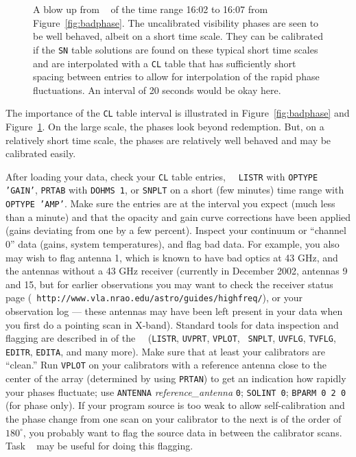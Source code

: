 \begin{figure}
\centering
\caption[{\tt VPLOT} of ``okay'' phases]{A blow up from {\tt
{}} of the time range 16:02 to 16:07 from
Figure~\ref{fig:badphase}.  The uncalibrated visibility phases are
seen to be well behaved, albeit on a short time scale.  They can be
calibrated if the {\tt SN} table solutions are found on these
typical short time scales and are interpolated with a {\tt CL} table
that has sufficiently short spacing between entries to allow for
interpolation of the rapid phase fluctuations.  An interval of 20
seconds would be okay here.}
\label{fig:okphase}
\end{figure}

The importance of the {\tt CL} table interval is illustrated in
Figure~\ref{fig:badphase} and Figure~\ref{fig:okphase}.  On the large
scale, the phases look beyond redemption.  But, on a relatively short
time scale, the phases are relatively well behaved and may be
calibrated easily.

After loading your data, check your {\tt CL} table entries, \eg\ {\tt
LISTR} with {\tt OPTYPE 'GAIN'}, {\tt PRTAB} with {\tt DOHMS 1}, or
{\tt SNPLT} on a short (few minutes) time range with {\tt OPTYPE
'AMP'}\@.  Make sure the entries are at the interval you expect (much
less than a minute) and that the opacity and gain curve corrections
have been applied (gains deviating from one by a few percent).
Inspect your continuum or ``channel 0'' data (gains, system
temperatures), and flag bad data. For example, you also may wish to
flag antenna 1, which is known to have bad optics at 43 GHz, and the
antennas without a 43 GHz receiver (currently in December 2002,
antennas 9 and 15, but for earlier observations you may want to check
the receiver status page ({\tt
http://www.vla.nrao.edu/astro/guides/highfreq/}),
or your observation log --- these antennas may have been left present
in your data when you first do a pointing scan in X-band).  Standard
tools for data inspection and flagging are described in  of
the \AIPS\ \cookbook\ ({\tt LISTR}, {\tt UVPRT}, {\tt VPLOT}, {\tt
SNPLT}, {\tt UVFLG}, {\tt TVFLG}, {\tt EDITR}, {\tt EDITA}, and many
more).  Make sure that at least your calibrators are ``clean.''  Run
{\tt VPLOT} on your calibrators with a reference antenna close to the
center of the array (determined by using {\tt PRTAN}) to get an
indication how rapidly your phases fluctuate; use {\tt ANTENNA} {\it
reference\_antenna} {\tt 0}; {\tt SOLINT 0}; {\tt BPARM 0 2 0} (for
phase only).  If your program source is too weak to allow
self-calibration and the phase change from one scan on your calibrator
to the next is of the order of $180^{\circ}$, you probably want to
flag the source data in between the calibrator scans.  Task {\tt
{}} may be useful for doing this flagging.

